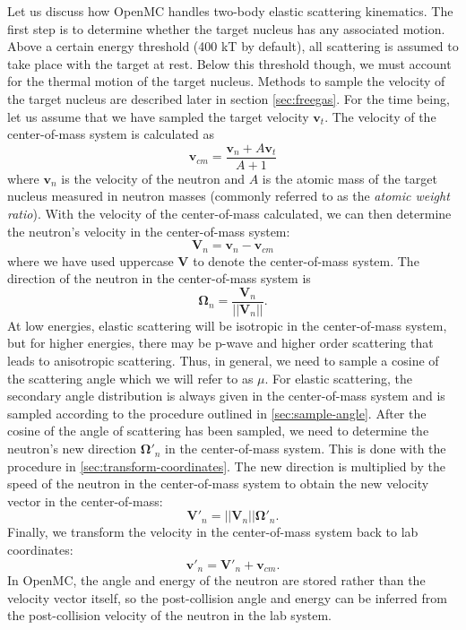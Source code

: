 Let us discuss how OpenMC handles two-body elastic scattering kinematics. The
first step is to determine whether the target nucleus has any associated
motion. Above a certain energy threshold (400 kT by default), all scattering is
assumed to take place with the target at rest. Below this threshold though, we
must account for the thermal motion of the target nucleus. Methods to sample the
velocity of the target nucleus are described later in section
\autoref{sec:freegas}. For the time being, let us assume that we have sampled
the target velocity $\mathbf{v}_t$. The velocity of the center-of-mass system is
calculated as
\begin{equation}
  \label{eq:velocity-com}
  \mathbf{v}_{cm} = \frac{\mathbf{v}_n + A \mathbf{v}_t}{A + 1}
\end{equation}
where $\mathbf{v}_n$ is the velocity of the neutron and $A$ is the atomic mass
of the target nucleus measured in neutron masses (commonly referred to as the
\emph{atomic weight ratio}). With the velocity of the center-of-mass calculated,
we can then determine the neutron's velocity in the center-of-mass system:
\begin{equation}
  \label{eq:velocity-neutron-com}
  \mathbf{V}_n = \mathbf{v}_n - \mathbf{v}_{cm}
\end{equation}
where we have used uppercase $\mathbf{V}$ to denote the center-of-mass
system. The direction of the neutron in the center-of-mass system is
\begin{equation}
  \label{eq:angle-neutron-com}
  \mathbf{\Omega}_n = \frac{\mathbf{V}_n}{|| \mathbf{V}_n ||}.
\end{equation}
At low energies, elastic scattering will be isotropic in the center-of-mass
system, but for higher energies, there may be p-wave and higher order scattering
that leads to anisotropic scattering. Thus, in general, we need to sample a
cosine of the scattering angle which we will refer to as $\mu$. For elastic
scattering, the secondary angle distribution is always given in the
center-of-mass system and is sampled according to the procedure outlined in
\autoref{sec:sample-angle}. After the cosine of the angle of scattering has been
sampled, we need to determine the neutron's new direction $\mathbf{\Omega}'_n$
in the center-of-mass system. This is done with the procedure in
\autoref{sec:transform-coordinates}. The new direction is multiplied by the
speed of the neutron in the center-of-mass system to obtain the new velocity
vector in the center-of-mass:
\begin{equation}
  \label{eq:velocity-neutron-com-2}
  \mathbf{V}'_n = || \mathbf{V}_n || \mathbf{\Omega}'_n.
\end{equation}
Finally, we transform the velocity in the center-of-mass system back to lab
coordinates:
\begin{equation}
  \label{eq:velocity-neutron-lab}
  \mathbf{v}'_n = \mathbf{V}'_n + \mathbf{v}_{cm}.
\end{equation}
In OpenMC, the angle and energy of the neutron are stored rather than the
velocity vector itself, so the post-collision angle and energy can be inferred
from the post-collision velocity of the neutron in the lab system.

